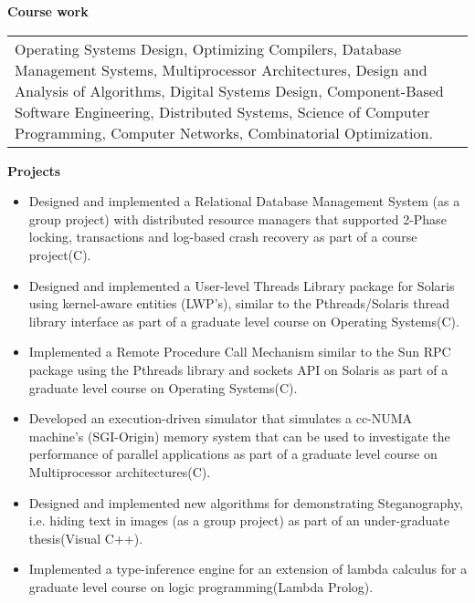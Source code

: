 \documentclass{article}
\begin{document}

  \vspace*{-0.1truein}
  \large \textbf{Course work}
  \vspace*{-0.2truein}
  \normalsize
  \begin{center}
  \begin{tabularx}{6.2in}{X}
        Operating Systems Design, Optimizing Compilers, Database Management Systems, Multiprocessor Architectures, Design and Analysis of Algorithms, Digital Systems Design, Component-Based Software Engineering, Distributed Systems, Science of Computer Programming, Computer Networks, Combinatorial Optimization. \\
  \end{tabularx}
  \end{center}


  \vspace*{-0.1truein}
  \large \textbf{Projects}
  \vspace*{-0.2truein}
  \normalsize
  \begin{center}
  \begin{itemize} 
  \item {Designed and implemented a Relational Database Management System (as a group project)
  			with distributed resource managers that supported 2-Phase locking, transactions and 
			log-based crash recovery as part of a course project(C).
		  }
  \item {Designed and implemented a User-level Threads Library package for Solaris using kernel-aware 
  		   entities (LWP's), similar to the Pthreads/Solaris thread library interface as part of a
			graduate level course on Operating Systems(C).
		  }
  \item {Implemented a Remote Procedure Call Mechanism similar to the Sun RPC package using the 
  			Pthreads library and sockets API on Solaris as part of a graduate level course on 
			Operating Systems(C).
		  }
  \item {Developed an execution-driven simulator that simulates a cc-NUMA machine's (SGI-Origin)
  			memory system that can be used to investigate the performance of parallel applications as 
			part of a graduate level course on Multiprocessor architectures(C).
		  }
  \item {Designed and implemented new algorithms for demonstrating Steganography, i.e. hiding text 
 		   in images (as a group project) as part of an under-graduate thesis(Visual C++).
		  }
  \item {Implemented a type-inference engine for an extension of lambda calculus for a graduate 
  		   level course on logic programming(Lambda Prolog).}
  \end{itemize}
  \end{center}
\end{document}
